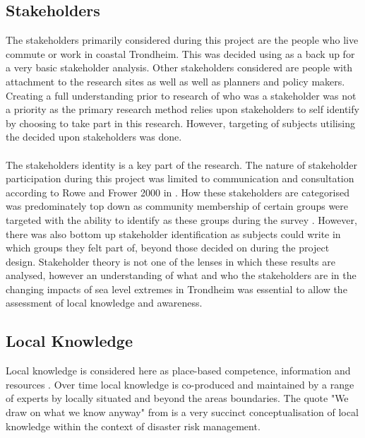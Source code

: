 \subsection{Stakeholders}
The stakeholders primarily considered during this project are the people who live commute or work in coastal Trondheim. This was decided using \cite{reed_stakeholder_nodate} as a back up for a very basic stakeholder analysis. Other stakeholders considered are people with attachment to the research sites as well as well as planners and policy makers. Creating a full understanding prior to research of who was a stakeholder was not a priority as the primary research method relies upon stakeholders to self identify by choosing to take part in this research. However, targeting of subjects utilising the decided upon stakeholders was done. 

\paragraph{}
The stakeholders identity is a key part of the research. The nature of stakeholder participation during this project was limited to communication and consultation according to Rowe and Frower 2000 in \cite{reed_stakeholder_nodate}. How these stakeholders are categorised was predominately top down as community membership of certain groups were targeted with the ability to identify as these groups during the survey \cite{reed_stakeholder_nodate}. However, there was also bottom up stakeholder identification as subjects could write in which groups they felt part of, beyond those decided on during the project design\cite{reed_stakeholder_nodate}. Stakeholder theory is not one of the lenses in which these results are analysed, however an understanding of what and who the stakeholders are in the changing impacts of sea level extremes in Trondheim was essential to allow the assessment of local knowledge and awareness. 

\subsection{Local Knowledge}

Local knowledge is considered here as place-based competence, information and resources \cite{setten_we_2019}. Over time local knowledge is co-produced and maintained by a range of experts by locally situated and beyond the areas boundaries. The quote "We draw on what we know anyway" from \cite{setten_we_2019} is a very succinct conceptualisation of local knowledge within the context of disaster risk management.

